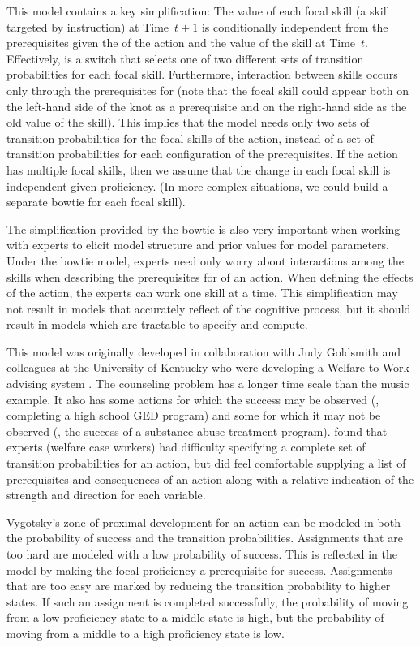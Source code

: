 \documentclass[12pt]{RR-article}
\begin{document}
This model contains a key simplification:  The value of each focal
skill (a skill targeted by instruction) at Time~$t+1$ is
conditionally independent from the prerequisites given the
 of the action and the value of 
the skill at Time~$t$.  Effectively,  is a switch that
selects one of two different sets of transition probabilities for
each focal skill.  Furthermore, interaction between skills occurs only
through the prerequisites for  (note that the focal skill could
appear both on the left-hand side of the knot as a prerequisite and on
the right-hand side as the old value of the skill).  This implies that
the model needs only two sets of transition probabilities for the
focal skills of the action, instead of a set of transition
probabilities for each configuration of the prerequisites.  If the
action has multiple focal skills, then we assume that the change in
each focal skill is independent given proficiency.  (In more complex
situations, we could build a separate bowtie for each focal skill).

The simplification provided by the bowtie is also very important when
working with experts to elicit model structure and prior values for
model parameters.  Under the bowtie model, experts need only worry
about interactions among the skills when describing the prerequisites
for  of an action.  When defining the effects of the
action, the experts can work one skill at a time.  This simplification
may not result in models that accurately reflect of the cognitive
process, but it should result in models which are tractable to specify
and compute.

This model was originally developed in collaboration with Judy
Goldsmith and colleagues at the University of Kentucky who were
developing a Welfare-to-Work advising system \cite{bowties,WelfareToWorkIJAR}.
The counseling problem has a longer time scale than the music example.
It also has some actions for which the success may be observed (\eg,
completing a high school GED program) and some for which it may not be
observed (\eg, the success of a substance abuse treatment program).
 found that experts (welfare case workers) had
difficulty specifying a complete set of transition
probabilities for an action, but did feel comfortable supplying a list
of prerequisites and consequences of an action along with a relative
indication of the strength and direction for each variable.

Vygotsky's zone of proximal development for an action can be modeled
in both the probability of success and the transition probabilities.
Assignments that are too hard are modeled with a low probability of
success.  This is reflected in the model by making the focal
proficiency a prerequisite for success.  Assignments that are too easy
are marked by reducing the transition probability to higher states.  If
such an assignment is completed successfully, the probability of
moving from a low proficiency state to a middle state is high, but the
probability of moving from a middle to a high proficiency state is
low.
\end{document}
